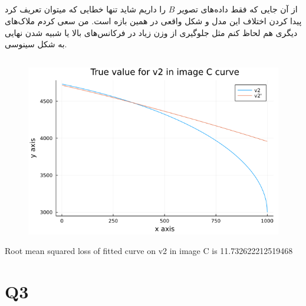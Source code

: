 \documentclass[a4paper]{article}
\begin{document}
\subsection{}
از آن جایی که فقط داده‌های تصویر 
$ B $
‌را داریم شاید تنها خطایی که میتوان تعریف کرد پیدا کردن اختلاف این مدل و شکل واقعی در همین بازه است. من سعی کردم ملاک‌های دیگری هم لحاظ کنم مثل جلوگیری از وزن زیاد در فرکانس‌های بالا یا شبیه شدن 
نهایی به شکل سینوسی. 
\subsection{}
\begin{figure}[H]
	\centering
	\includegraphics[width=0.75 \linewidth]{V2_curve_in_C}
	\caption{
	}
\end{figure}
\begin{center}
	\begin{latin}
		Root mean squared loss of fitted curve on v2 in image C is 11.732622212519468
	\end{latin}
\end{center}
\newpage
\section{Q3}
\end{document}
